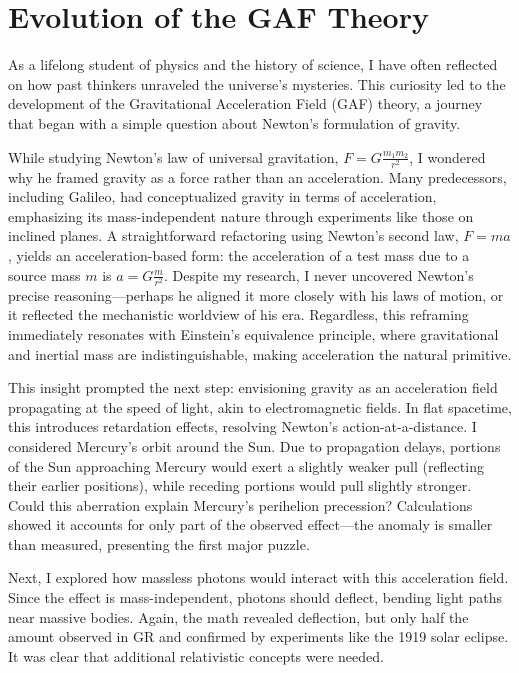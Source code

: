 \section{Evolution of the GAF Theory}

As a lifelong student of physics and the history of science, I have often reflected on how past thinkers unraveled the universe's mysteries. This curiosity led to the development of the Gravitational Acceleration Field (GAF) theory, a journey that began with a simple question about Newton's formulation of gravity.

While studying Newton's law of universal gravitation, \( F = G \frac{m_1 m_2}{r^2} \), I wondered why he framed gravity as a force rather than an acceleration. Many predecessors, including Galileo, had conceptualized gravity in terms of acceleration, emphasizing its mass-independent nature through experiments like those on inclined planes. A straightforward refactoring using Newton's second law, \( F = m a \), yields an acceleration-based form: the acceleration of a test mass due to a source mass \( m \) is \( a = G \frac{m}{r^2} \). Despite my research, I never uncovered Newton's precise reasoning—perhaps he aligned it more closely with his laws of motion, or it reflected the mechanistic worldview of his era. Regardless, this reframing immediately resonates with Einstein's equivalence principle, where gravitational and inertial mass are indistinguishable, making acceleration the natural primitive.

This insight prompted the next step: envisioning gravity as an acceleration field propagating at the speed of light, akin to electromagnetic fields. In flat spacetime, this introduces retardation effects, resolving Newton's action-at-a-distance. I considered Mercury's orbit around the Sun. Due to propagation delays, portions of the Sun approaching Mercury would exert a slightly weaker pull (reflecting their earlier positions), while receding portions would pull slightly stronger. Could this aberration explain Mercury's perihelion precession? Calculations showed it accounts for only part of the observed effect—the anomaly is smaller than measured, presenting the first major puzzle.

Next, I explored how massless photons would interact with this acceleration field. Since the effect is mass-independent, photons should deflect, bending light paths near massive bodies. Again, the math revealed deflection, but only half the amount observed in GR and confirmed by experiments like the 1919 solar eclipse. It was clear that additional relativistic concepts were needed.

